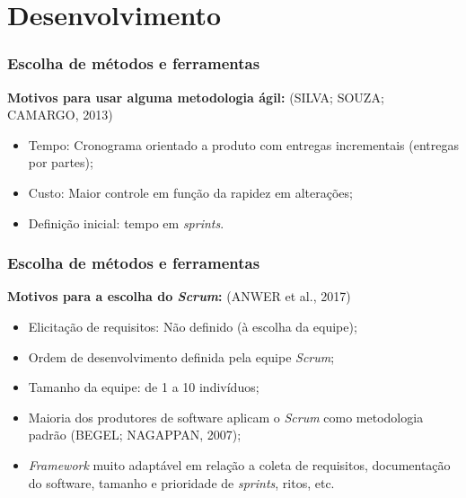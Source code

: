 \documentclass{beamer}
\begin{document}
\section{Desenvolvimento}
\begin{frame}
    \frametitle{Escolha de métodos e ferramentas}
    \textbf{Motivos para usar alguma metodologia ágil:} (SILVA; SOUZA; CAMARGO, 2013)
    \begin{itemize}
        \item Tempo: Cronograma orientado a produto com entregas incrementais (entregas por partes);
        \item Custo: Maior controle em função da rapidez em alterações; %
        \item Definição inicial: tempo em \textit{sprints}.
    \end{itemize}
    
\end{frame}

\begin{frame}
 \frametitle{Escolha de métodos e ferramentas}
    \textbf{Motivos para a escolha do \textit{Scrum}:} (ANWER et al., 2017)
    \begin{itemize}
        \item Elicitação de requisitos: Não definido (à escolha da equipe); %
        \item Ordem de desenvolvimento definida pela equipe \textit{Scrum}; %
        \item Tamanho da equipe: de 1 a 10 indivíduos; %
        \item Maioria dos produtores de software aplicam o \textit{Scrum} como metodologia padrão (BEGEL; NAGAPPAN, 2007);
        \item \textit{Framework} muito adaptável em relação a coleta de requisitos, documentação do software, tamanho e prioridade de \textit{sprints}, ritos, etc.  
    \end{itemize}
\end{frame}
\end{document}
